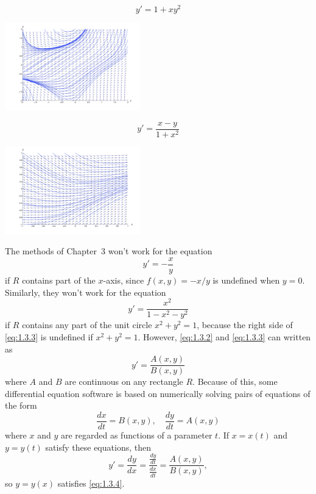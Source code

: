 \documentclass{ximera}
\begin{document}
\begin{example}\label{ex:fig010303}
$$
y'=1+xy^2
$$
\begin{image}
  \includegraphics[height=1.5in]{fig010303.jpg}
\end{image}
\end{example}
\begin{example}\label{ex:fig010304}
$$
y'=\frac{x-y}{1+x^2}
$$
\begin{image}
   \includegraphics[height=1.5in]{fig010304.jpg}
\end{image}
\end{example}
The methods of {\color{red}Chapter~3} won't work for the equation
\begin{equation} \label{eq:1.3.2}
y'=-\frac{x}{y}
\end{equation}
if $R$ contains part of the $x$-axis, since $f(x,y)=-x/y$ is undefined
when $y=0$. Similarly, they won't work for the equation
\begin{equation} \label{eq:1.3.3}
y'=\frac{x^2}{1-x^2-y^2}
\end{equation}
if $R$ contains any part of the unit circle $x^2+y^2=1$, because the
right side of \eqref{eq:1.3.3} is undefined if $x^2+y^2=1$. However,
\eqref{eq:1.3.2} and \eqref{eq:1.3.3} can written as
\begin{equation} \label{eq:1.3.4}
y'=\frac{A(x,y)}{B(x,y)}
\end{equation}
where $A$ and $B$ are  continuous on any rectangle $R$. Because of
this,
some differential equation software is based on
numerically solving pairs of equations of the form
\begin{equation} \label{eq:1.3.5}
\frac{dx}{dt}=B(x,y),\quad \frac{dy}{dt}=A(x,y)
\end{equation}
where $x$ and $y$ are regarded as functions of a parameter $t$.
If $x=x(t)$ and $y=y(t)$  satisfy these equations, then
$$
y'=\frac{dy}{dx}=\frac{\frac{dy}{dt}}{\frac{dx}{dt}}=\frac{A(x,y)}{B(x,y)},
$$
so $y=y(x)$ satisfies \eqref{eq:1.3.4}.
\end{document}
